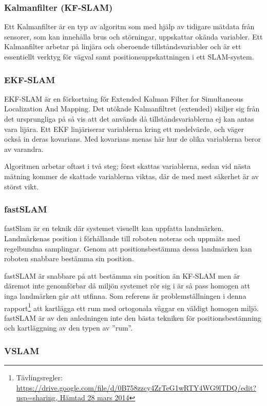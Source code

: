 \documentclass[a4paper,12pt,fleqn]{article}
\begin{document}
\subsubsection{Kalmanfilter (KF-SLAM)}
Ett Kalmanfilter är en typ av algoritm som med hjälp av tidigare mätdata från sensorer, som kan innehålla brus och störningar, uppskattar okända variabler. Ett Kalmanfilter arbetar på linjära och oberoende tillståndsvariabler och är ett essentiellt verktyg för vägval samt positionsuppskattningen i ett SLAM-system. 

\subsubsection{EKF-SLAM} 
EKF-SLAM är en förkortning för Extended Kalman Filter for Simultaneous Localization And Mapping. Det utökade Kalmanfiltret (extended) skiljer sig från det ursprungliga på så vis att det används då tillståndsvariablerna ej kan antas vara lijära. Ett EKF linjäriserar variablerna kring ett medelvärde, och väger också in deras kovarians. Med kovarians menas här hur de olika variablerna beror av varandra.

Algoritmen arbetar oftast i två steg; först skattas variablerna, sedan vid nästa mätning 
kommer de skattade variablerna viktas, där de med mest säkerhet är av störst vikt.

\subsubsection{fastSLAM}
fastSlam är en teknik där systemet visuellt kan uppfatta landmärken. Landmärkenas position i förhållande till roboten noteras och uppmäts med regelbundna samplingar. Genom att positionsbestämma dessa landmärken kan roboten snabbare bestämma sin position. 

fastSLAM är snabbare på att bestämma sin position än KF-SLAM men är däremot inte genomförbar då miljön systemet rör sig i är så pass homogen att inga landmärken går att utfinna. Som referens är problemställningen i denna rapport\footnote{Tävlingsregler: \url{https://drive.google.com/file/d/0B758zzcy4ZrTeG1wRTY4WG9lTDQ/edit?usp=sharing, Hämtad 28 mars 2014}} att kartlägga ett rum med ortogonala väggar en väldigt homogen miljö. fastSLAM är av den anledningen inte den bästa tekniken för positionsbestämning och kartläggning av den typen av ''rum''. 



\subsubsection{VSLAM}
\end{document}
